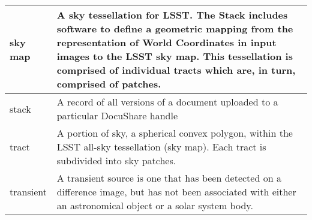 \begin{longtable}{|l|p{}|}
sky map & A sky tessellation for LSST. The Stack includes software to define a geometric mapping from the representation of World Coordinates in input images to the LSST sky map. This tessellation is comprised of individual tracts which are, in turn, comprised of patches. \\\hline
stack & A record of all versions of a document uploaded to a particular DocuShare handle \\\hline
tract & A portion of sky, a spherical convex polygon, within the LSST all-sky tessellation (sky map). Each tract is subdivided into sky patches. \\\hline
transient & A transient source is one that has been detected on a difference image, but has not been associated with either an astronomical object or a solar system body. \\\hline
\end{longtable}
